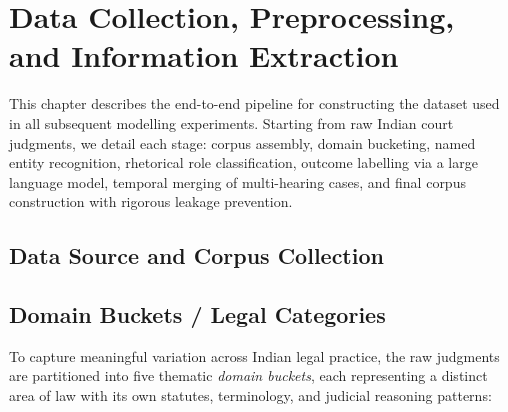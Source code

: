 \chapter{Data Collection, Preprocessing, and Information Extraction}
\label{ch:data}

This chapter describes the end-to-end pipeline for constructing the dataset used in all subsequent modelling experiments. Starting from raw Indian court judgments, we detail each stage: corpus assembly, domain bucketing, named entity recognition, rhetorical role classification, outcome labelling via a large language model, temporal merging of multi-hearing cases, and final corpus construction with rigorous leakage prevention.

\section{Data Source and Corpus Collection}
\label{sec:data-source}


\section{Domain Buckets / Legal Categories}
\label{sec:domain-buckets}

To capture meaningful variation across Indian legal practice, the raw judgments are partitioned into five thematic \emph{domain buckets}, each representing a distinct area of law with its own statutes, terminology, and judicial reasoning patterns:

